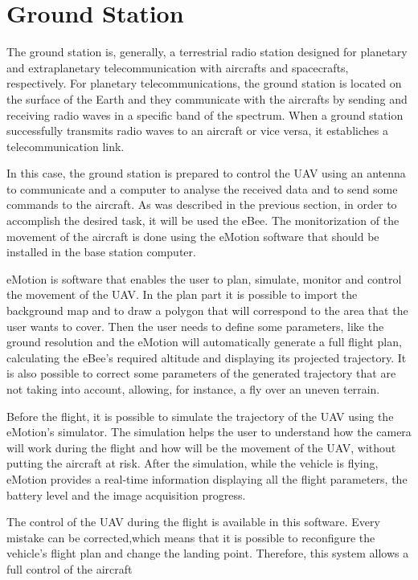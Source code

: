 \section{Ground Station}\label{sec:gs}

The ground station is, generally, a terrestrial radio station designed for planetary and extraplanetary telecommunication with aircrafts and spacecrafts, respectively. For planetary telecommunications, the ground station is located on the surface of the Earth and they communicate with the aircrafts by sending and receiving radio waves in a specific band of the spectrum. When a ground station successfully transmits radio waves to an aircraft or vice versa, it establiches a telecommunication link.

In this case, the ground station is prepared to control the UAV using an antenna to communicate and a computer to analyse the received data and to send some commands to the aircraft. As was described in the previous section, in order to accomplish the desired task, it will be used the eBee. The monitorization of the movement of the aircraft is done using the eMotion software that should be installed in the base station computer.

eMotion is software that enables the user to plan, simulate, monitor and control the movement of the UAV. In the plan part it is possible to import the background map and to draw a polygon that will correspond to the area that the user wants to cover. Then the user needs to define some parameters, like the ground resolution and the eMotion will automatically generate a full flight plan, calculating the eBee’s required altitude and displaying its projected trajectory. It is also possible to correct some parameters of the generated trajectory that are not taking into account, allowing, for instance, a fly over an uneven terrain.

Before the flight, it is possible to simulate the trajectory of the UAV using the eMotion's simulator. The simulation helps the user to understand how the camera will work during the flight and how will be the movement of the UAV, without putting the aircraft at risk. After the simulation, while the vehicle is flying, eMotion provides a real-time information displaying all the flight parameters, the battery level and the image acquisition progress.

The control of the UAV during the flight is available in this software. Every mistake can be corrected,which means that it is possible to reconfigure the vehicle's flight plan and change the landing point. Therefore, this system allows a full control of the aircraft 